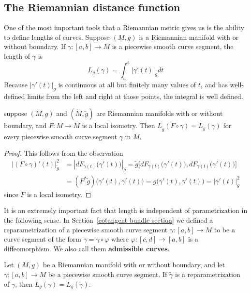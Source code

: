 \subsection{The Riemannian distance function}
One of the most important tools that a Riemannian metric gives us is the ability to define lengths of curves. Suppose $(M,g)$ is a Riemannian manifold with or without
boundary. If $\gamma:[a,b]\to M$ is a piecewise smooth curve segment, the length of $\gamma$ is
\[L_g(\gamma)=\int_{a}^{b}|\gamma'(t)|_gdt\]
Because $|\gamma'(t)|_g$ is continuous at all but finitely many values of $t$, and has well-defined limits from the left and right at those points, the integral is well defined.
\begin{proposition}\label{Riemann isometry length}
suppose $(M,g)$ and $(\widetilde{M},\widetilde{g})$ are Riemannian manifolds with or without boundary, and $F:M\to\widetilde{M}$ is a local isometry. Then $L_{\widetilde{g}}(F\circ\gamma)=L_g(\gamma)$ for every piecewise smooth curve segment $\gamma$ in $M$.
\end{proposition}
\begin{proof}
This follows from the observation
\begin{align*}
|(F\circ\gamma)'(t)|_{\widetilde{g}}^2&=|dF_{\gamma(t)}\big(\gamma'(t)\big)|_{\widetilde{g}}=\widetilde{g}\big[dF_{\gamma(t)}\big(\gamma'(t)\big),dF_{\gamma(t)}\big(\gamma'(t)\big)\big]\\
&=(F^*\widetilde{g})\big(\gamma'(t),\gamma'(t)\big)=g\big(\gamma'(t),\gamma'(t)\big)=|\gamma'(t)|^2_g
\end{align*}
since $F$ is a local isometry.
\end{proof}
It is an extremely important fact that length is independent of 
parametrization in the following sense. In 
Section~\ref{cotangent bundle section} we defined a reparametrization of 
a piecewise smooth curve segment $\gamma:[a,b]\to M$ to be a curve 
segment of the form $\widetilde{\gamma}=\gamma\circ\varphi$ where 
$\varphi:[c,d]\to[a,b]$ is a diffeomorphism. We also call them 
\textbf{admissible curves}.
\begin{proposition}
Let $(M,g)$ be a Riemannian manifold with or without boundary, and let $\gamma:[a,b]\to M$ be a piecewise smooth curve segment. If $\widetilde{\gamma}$ is a reparametrization of $\gamma$, then $L_g(\gamma)=L_g(\widetilde{\gamma})$.
\end{proposition}

